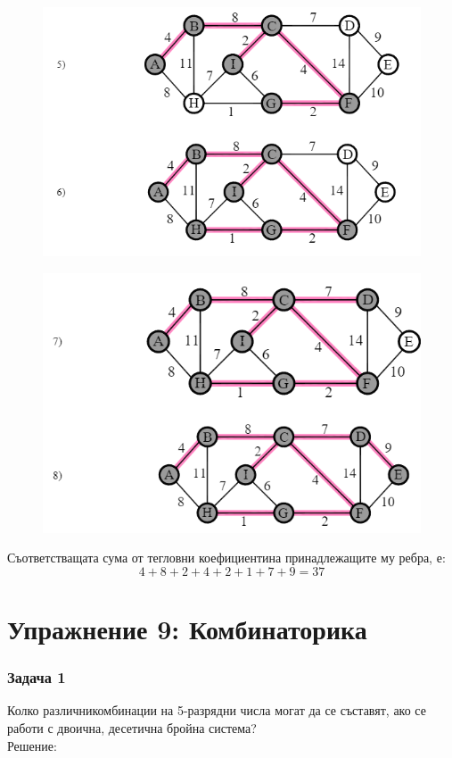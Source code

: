 \documentclass[fleqn, 12pt]{article}
\theoremstyle{definition}
\begin{document}
\begin{figure} [htp!]
\includegraphics{Pics/Discrete math/ex8/ex8-task8-3.png}
\end{figure}
\begin{figure} [htp!]
\includegraphics{Pics/Discrete math/ex8/ex8-task8-4.png}
\end{figure}
Съответстващата сума от тегловни коефициентина принадлежащите му ребра, е:
$$ 4 + 8 + 2 + 4 + 2 + 1 + 7 + 9 = 37$$

\newpage
\section{Упражнение 9: Комбинаторика}

\subsubsection*{Задача 1}
Колко различникомбинации на 5-разрядни числа могат да се съставят, ако се работи с двоична, десетична бройна система? \\
Решение:
\end{document}
